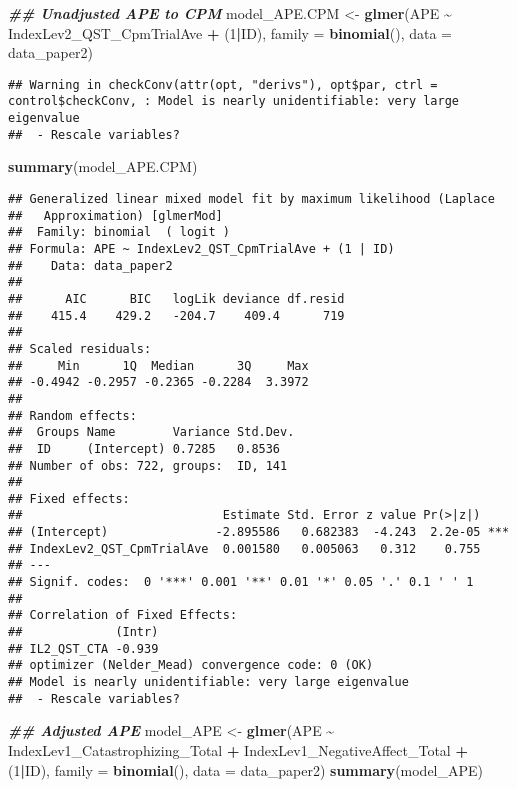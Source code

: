 \documentclass[
  12pt,
]{article}
\newenvironment{Shaded}{\begin{snugshade}}{\end{snugshade}}
\newcommand{\AttributeTok}[1]{\textcolor[rgb]{0.13,0.29,0.53}{#1}}
\newcommand{\DecValTok}[1]{\textcolor[rgb]{0.00,0.00,0.81}{#1}}
\newcommand{\DocumentationTok}[1]{\textcolor[rgb]{0.56,0.35,0.01}{\textbf{\textit{#1}}}}
\newcommand{\FunctionTok}[1]{\textcolor[rgb]{0.13,0.29,0.53}{\textbf{#1}}}
\newcommand{\NormalTok}[1]{#1}
\newcommand{\OtherTok}[1]{\textcolor[rgb]{0.56,0.35,0.01}{#1}}
\newcommand{\SpecialCharTok}[1]{\textcolor[rgb]{0.81,0.36,0.00}{\textbf{#1}}}
\begin{document}
\begin{Shaded}
\begin{Highlighting}[]
\DocumentationTok{\#\# Unadjusted APE to CPM}
\NormalTok{model\_APE.CPM }\OtherTok{\textless{}{-}} \FunctionTok{glmer}\NormalTok{(APE }\SpecialCharTok{\textasciitilde{}}\NormalTok{ IndexLev2\_QST\_CpmTrialAve }\SpecialCharTok{+}\NormalTok{ (}\DecValTok{1}\SpecialCharTok{|}\NormalTok{ID), }\AttributeTok{family =} \FunctionTok{binomial}\NormalTok{(), }\AttributeTok{data =}\NormalTok{ data\_paper2)}
\end{Highlighting}
\end{Shaded}

\begin{verbatim}
## Warning in checkConv(attr(opt, "derivs"), opt$par, ctrl = control$checkConv, : Model is nearly unidentifiable: very large eigenvalue
##  - Rescale variables?
\end{verbatim}

\begin{Shaded}
\begin{Highlighting}[]
\FunctionTok{summary}\NormalTok{(model\_APE.CPM)}
\end{Highlighting}
\end{Shaded}

\begin{verbatim}
## Generalized linear mixed model fit by maximum likelihood (Laplace
##   Approximation) [glmerMod]
##  Family: binomial  ( logit )
## Formula: APE ~ IndexLev2_QST_CpmTrialAve + (1 | ID)
##    Data: data_paper2
## 
##      AIC      BIC   logLik deviance df.resid 
##    415.4    429.2   -204.7    409.4      719 
## 
## Scaled residuals: 
##     Min      1Q  Median      3Q     Max 
## -0.4942 -0.2957 -0.2365 -0.2284  3.3972 
## 
## Random effects:
##  Groups Name        Variance Std.Dev.
##  ID     (Intercept) 0.7285   0.8536  
## Number of obs: 722, groups:  ID, 141
## 
## Fixed effects:
##                            Estimate Std. Error z value Pr(>|z|)    
## (Intercept)               -2.895586   0.682383  -4.243  2.2e-05 ***
## IndexLev2_QST_CpmTrialAve  0.001580   0.005063   0.312    0.755    
## ---
## Signif. codes:  0 '***' 0.001 '**' 0.01 '*' 0.05 '.' 0.1 ' ' 1
## 
## Correlation of Fixed Effects:
##             (Intr)
## IL2_QST_CTA -0.939
## optimizer (Nelder_Mead) convergence code: 0 (OK)
## Model is nearly unidentifiable: very large eigenvalue
##  - Rescale variables?
\end{verbatim}

\begin{Shaded}
\begin{Highlighting}[]
\DocumentationTok{\#\# Adjusted APE}
\NormalTok{model\_APE }\OtherTok{\textless{}{-}} \FunctionTok{glmer}\NormalTok{(APE }\SpecialCharTok{\textasciitilde{}}\NormalTok{ IndexLev1\_Catastrophizing\_Total }\SpecialCharTok{+}\NormalTok{ IndexLev1\_NegativeAffect\_Total }\SpecialCharTok{+}\NormalTok{ (}\DecValTok{1}\SpecialCharTok{|}\NormalTok{ID), }\AttributeTok{family =} \FunctionTok{binomial}\NormalTok{(), }\AttributeTok{data =}\NormalTok{ data\_paper2)}
\FunctionTok{summary}\NormalTok{(model\_APE)}
\end{Highlighting}
\end{Shaded}
\end{document}
